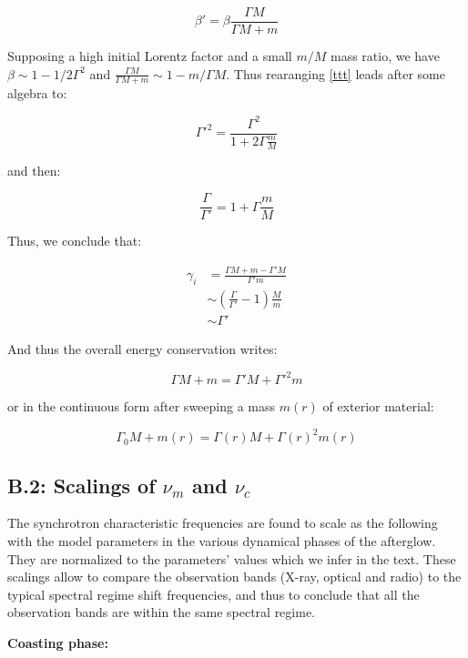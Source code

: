 \begin{equation}\label{ttt}
    \beta' = \beta \frac{\Gamma M}{\Gamma M + m}
\end{equation}

Supposing a high initial Lorentz factor and a small $m/M$ mass ratio, we have $\beta \sim 1 - 1/2\Gamma^2$ and $\frac{\Gamma M}{\Gamma M + m} \sim 1 - m/\Gamma M$. Thus rearanging \ref{ttt} leads after some algebra to:

\begin{equation}
    \Gamma'^2 = \frac{\Gamma ^ 2}{1 + 2\Gamma \frac{m}{M}}
\end{equation}

and then:

\begin{equation}
    \frac{\Gamma}{\Gamma'} = 1 + \Gamma \frac{m}{M}
\end{equation}

Thus, we conclude that:

\begin{align}
    \gamma_i &= \frac{\Gamma M + m - \Gamma'M}{\Gamma'm} \\
             &\sim \left( \frac{\Gamma}{\Gamma'} -1 \right)\frac{M}{m}\\
             &\sim \Gamma'
\end{align}

And thus the overall energy conservation writes:

\begin{equation}
    \Gamma M + m = \Gamma'M + \Gamma'^2 m
\end{equation}

or in the continuous form after sweeping a mass $m(r)$ of exterior material:

$$\Gamma_0 M + m(r) = \Gamma(r) M + \Gamma(r)^2 m(r) $$


\subsection*{B.2: Scalings of $\nu_m$ and $\nu_c$}
The synchrotron characteristic frequencies are found to scale as the following with the model parameters in the various dynamical phases of the afterglow. They are normalized to the parameters' values which we infer in the text. These scalings allow to compare the observation bands (X-ray, optical and radio) to the typical spectral regime shift frequencies, and thus to conclude that all the observation bands are within the same spectral regime.

\bf{Coasting phase:}

